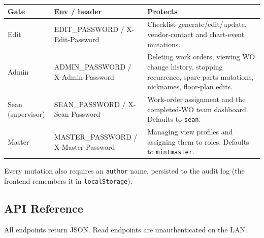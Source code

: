 \documentclass[11pt,a4paper]{article}
\newcommand{\code}[1]{\texttt{#1}}
\begin{document}
\begin{longtable}{@{}p{}>{\ttfamily}p{}p{}@{}}
\toprule
\textbf{Gate} & \textbf{Env / header} & \textbf{Protects} \\
\midrule
\endhead
Edit & EDIT\_PASSWORD / X-Edit-Password & Checklist generate/edit/update, vendor-contact and chart-event mutations. \\
Admin & ADMIN\_PASSWORD / X-Admin-Password & Deleting work orders, viewing WO change history, stopping recurrence, spare-parts mutations, nicknames, floor-plan edits. \\
Sean (supervisor) & SEAN\_PASSWORD / X-Sean-Password & Work-order assignment and the completed-WO team dashboard. Defaults to \code{sean}. \\
Master & MASTER\_PASSWORD / X-Master-Password & Managing view profiles and assigning them to roles. Defaults to \code{mintmaster}. \\
\bottomrule
\end{longtable}

Every mutation also requires an \code{author} name, persisted to the audit
log (the frontend remembers it in \code{localStorage}).

\subsection{API Reference}
All endpoints return JSON. Read endpoints are unauthenticated on the LAN.
\end{document}

